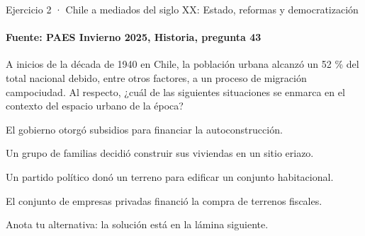 \documentclass[aspectratio=169,11pt]{beamer}
\newcommand{\alternativa}[2]{\begin{opcion}\tecla{#1}\hspace{0.6em}#2\end{opcion}}
\newlength{\ajustealto}
\newenvironment{ajustar}[1][0.74\textheight]
  {\setlength{\ajustealto}{#1}\begin{lrbox}{\ajustecaja}\begin{minipage}{\textwidth}}
  {\end{minipage}\end{lrbox}%
   \ifdim\dimexpr\ht\ajustecaja+\dp\ajustecaja\relax>\ajustealto
     \resizebox*{!}{\ajustealto}{\usebox{\ajustecaja}}\else\usebox{\ajustecaja}\fi}
\begin{document}
\begin{frame}{Ejercicio 2 · Chile a mediados del siglo XX: Estado, reformas y democratización}
\framesubtitle{Fuente: PAES Invierno 2025, Historia, pregunta 43}
\begin{ajustar}[0.7\textheight]
{\small A inicios de la década de 1940 en Chile, la población urbana alcanzó un 52 \% del total nacional debido, entre otros factores, a un proceso de migración campociudad. Al respecto, ¿cuál de las siguientes situaciones se enmarca en el contexto del espacio urbano de la época?}
\vspace{0.4em}
\alternativa{A}{El gobierno otorgó subsidios para financiar la autoconstrucción.}
\alternativa{B}{Un grupo de familias decidió construir sus viviendas en un sitio eriazo.}
\alternativa{C}{Un partido político donó un terreno para edificar un conjunto habitacional.}
\alternativa{D}{El conjunto de empresas privadas financió la compra de terrenos fiscales.}
\end{ajustar}
\vfill{\tiny\color{zinc500}\hfill Anota tu alternativa: la solución está en la lámina siguiente.}
\end{frame}
\end{document}
